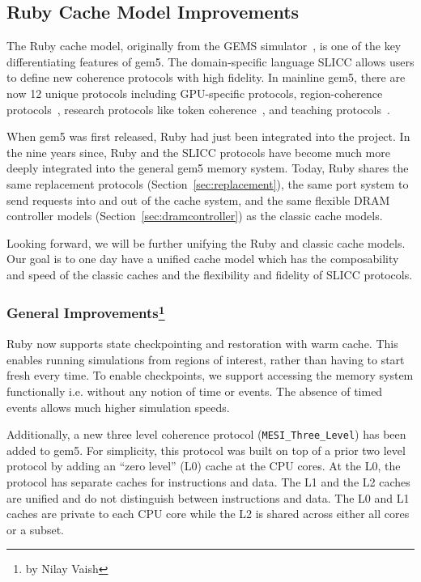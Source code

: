 \subsection[Ruby Cache Model Improvements]{Ruby Cache Model Improvements}
\label{sec:ruby}

The Ruby cache model, originally from the GEMS simulator~\cite{MartinSBMXAMHW05}, is one of the key differentiating features of gem5.
The domain-specific language SLICC allows users to define new coherence protocols with high fidelity.
In mainline gem5, there are now 12 unique protocols including GPU-specific protocols, region-coherence protocols~\cite{PowerBasu2013-hsc}, research protocols like token coherence~\cite{MartinHill2003-tokenCoh}, and teaching protocols~\cite{NagarajanSorin2020-cohMCMPrimer}.

When gem5 was first released, Ruby had just been integrated into the project.
In the nine years since, Ruby and the SLICC protocols have become much more deeply integrated into the general gem5 memory system.
Today, Ruby shares the same replacement protocols (Section~\ref{sec:replacement}), the same port system to send requests into and out of the cache system, and the same flexible DRAM controller models (Section~\ref{sec:dramcontroller}) as the classic cache models.

Looking forward, we will be further unifying the Ruby and classic cache models.
Our goal is to one day have a unified cache model which has the composability and speed of the classic caches and the flexibility and fidelity of SLICC protocols.

\subsubsection[General Improvements]{General Improvements\footnote{by Nilay Vaish}}

Ruby now supports state checkpointing and restoration with warm cache.
This enables running simulations from regions of interest, rather than having to start fresh every time.
To enable checkpoints, we support accessing the memory system functionally i.e. without any notion of time or events.
The absence of timed events allows much higher simulation speeds.

Additionally, a new three level coherence protocol (\lstinline|MESI_Three_Level|) has been added to gem5.
For simplicity, this protocol was built on top of a prior two level protocol by adding an ``zero level'' (L0) cache at the CPU cores.
At the L0, the protocol has separate caches for instructions and data.
The L1 and the L2 caches are unified and do not distinguish between instructions and data.
The L0 and L1 caches are private to each CPU core while the L2 is shared across either all cores or a subset.

